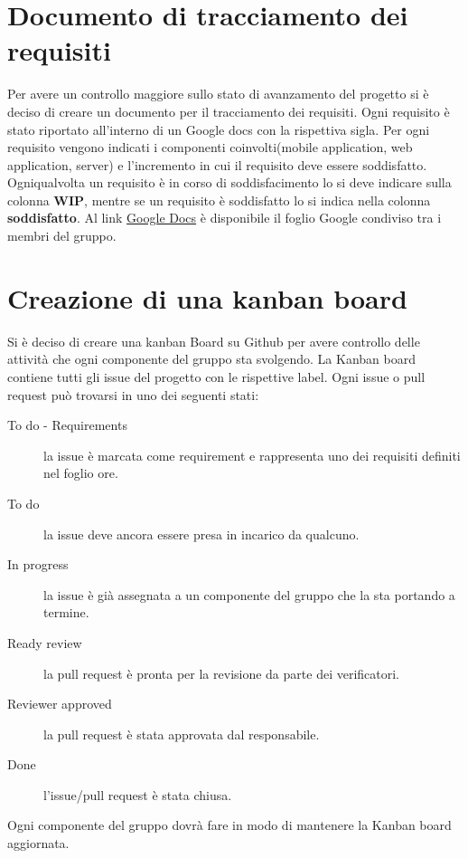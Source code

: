 \documentclass{article}
\begin{document}
\section{Documento di tracciamento dei requisiti}%
\label{sec:documento_di_tracciamento_dei_requisiti}

Per avere un controllo maggiore sullo stato di avanzamento del progetto si è deciso di creare un documento per il tracciamento dei requisiti.
Ogni requisito è stato riportato all'interno di un Google docs  con la rispettiva sigla.
Per ogni requisito vengono indicati i componenti coinvolti(mobile application, web application, server) e l'incremento in cui il requisito deve essere soddisfatto.
Ogniqualvolta un requisito è in corso di soddisfacimento lo si deve indicare sulla colonna \textbf{WIP}, mentre se un requisito è soddisfatto lo si indica nella colonna \textbf{soddisfatto}.
Al link \href{https://docs.google.com/spreadsheets/d/1J-RbNrb1yN_X1rVlKzpP9rjaiGst8B62k1K6EHY-grU/edit#gid=0}{Google Docs} è disponibile il foglio Google condiviso tra i membri del gruppo.

\section{Creazione di una kanban board}%
\label{sec:creazione_di_una_kanban_board}

Si è deciso di creare una kanban Board su Github per avere controllo delle attività che ogni componente del gruppo sta svolgendo.
La Kanban board contiene tutti gli issue del progetto con le rispettive label. Ogni issue o pull request può trovarsi in uno dei seguenti stati:
\begin{description}
  \item [To do - Requirements] la issue è marcata come requirement e rappresenta uno dei requisiti definiti nel foglio ore.
  \item [To do] la issue deve ancora essere presa in incarico da qualcuno.
  \item [In progress] la issue è già assegnata a un componente del gruppo che la sta portando a termine.
  \item [Ready review] la pull request è pronta per la revisione da parte dei verificatori.
  \item [Reviewer approved] la pull request è stata approvata dal responsabile.
  \item [Done] l'issue/pull request è stata chiusa.
\end{description}
Ogni componente del gruppo dovrà fare in modo di mantenere la Kanban board aggiornata.
\end{document}
